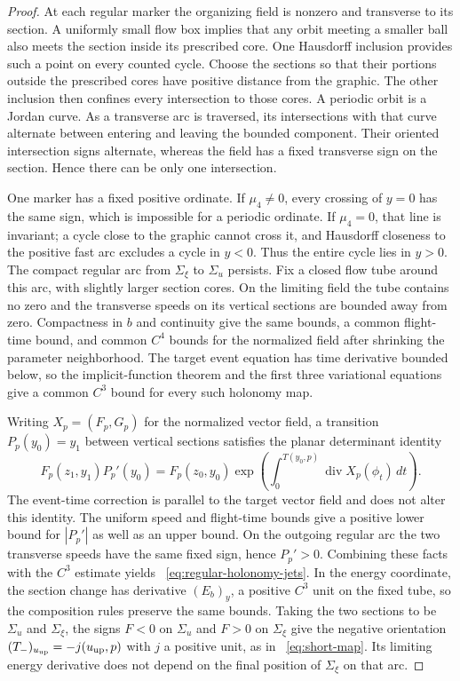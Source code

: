 \begin{proof}
At each regular marker the organizing field is nonzero and transverse
to its section. A uniformly small flow box implies that any orbit
meeting a smaller ball also meets the section inside its prescribed
core. One Hausdorff inclusion provides such a point on every counted
cycle. Choose the sections so that their portions outside the prescribed
cores have positive distance from the graphic. The other inclusion then
confines every intersection to those cores.
A periodic orbit is a Jordan curve. As a transverse arc is traversed,
its intersections with that curve alternate between entering and
leaving the bounded component. Their oriented intersection signs
alternate, whereas the field has a fixed transverse sign on the
section. Hence there can be only one intersection.

One marker has a fixed positive ordinate. If $\mu_4\ne0$, every
crossing of $y=0$ has the same sign, which is impossible for a
periodic ordinate. If $\mu_4=0$, that line is invariant; a cycle close
to the graphic cannot cross it, and Hausdorff closeness to the positive
fast arc excludes a cycle in $y<0$. Thus the entire cycle lies in
$y>0$. The compact regular arc from
$\Sigma_\xi$ to $\Sigma_u$ persists. Fix a closed flow tube around this
arc, with slightly larger section cores. On the limiting field the tube
contains no zero and the transverse speeds on its vertical sections are
bounded away from zero. Compactness in $b$ and continuity give the same
bounds, a common flight-time bound, and common $C^4$ bounds for the
normalized field after shrinking the parameter neighborhood. The target
event equation has time derivative bounded below, so the implicit-function
theorem and the first three variational equations give a common $C^3$ bound
for every such holonomy map.

Writing $X_p=(F_p,G_p)$ for the normalized vector field, a transition
$P_p(y_0)=y_1$ between vertical sections satisfies the planar determinant
identity
\begin{equation}\label{eq:holonomy-determinant}
 F_p(z_1,y_1)P_p'(y_0)=F_p(z_0,y_0)
 \exp\!\left(\int_0^{T(y_0,p)}\operatorname{div}X_p(\phi_t)\,dt\right).
\end{equation}
The event-time correction is parallel to the target vector field and does
not alter this identity. The uniform speed and flight-time bounds give a
positive lower bound for $|P_p'|$ as well as an upper bound. On the outgoing
regular arc the two transverse speeds have the same fixed sign, hence
$P_p'>0$. Combining these facts with the $C^3$ estimate yields
~\eqref{eq:regular-holonomy-jets}.
In the energy coordinate, the section change has derivative $(E_b)_y$, a
positive $C^3$ unit on the fixed tube, so the composition rules preserve
the same bounds. Taking the two sections to be $\Sigma_u$ and $\Sigma_\xi$,
the signs $F<0$ on $\Sigma_u$ and $F>0$ on $\Sigma_\xi$ give the negative
orientation $(T_-)_{u_{\rm up}}=-j(u_{\rm up},p)$ with $j$ a positive
unit, as in
~\eqref{eq:short-map}. Its limiting energy derivative does not depend on
the final position of $\Sigma_\xi$ on that arc.


\end{proof}
